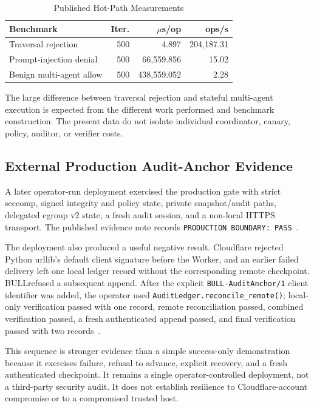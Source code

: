 \documentclass[journal]{IEEEtran}
\newcommand{\bull}{\textsc{BULL}}
\begin{document}
\begin{table}[!t]
\caption{Published Hot-Path Measurements}
\label{tab:hotpath}
\centering
\small
\begin{tabularx}{\columnwidth}{Yrrr}
\toprule
\textbf{Benchmark} & \textbf{Iter.} & \textbf{$\mu$s/op} & \textbf{ops/s} \\
\midrule
Traversal rejection & 500 & 4.897 & 204{,}187.31 \\
Prompt-injection denial & 500 & 66{,}559.856 & 15.02 \\
Benign multi-agent allow & 500 & 438{,}559.052 & 2.28 \\
\bottomrule
\end{tabularx}
\end{table}

The large difference between traversal rejection and stateful multi-agent execution is expected from the different work performed and benchmark construction. The present data do not isolate individual coordinator, canary, policy, auditor, or verifier costs.

\subsection{External Production Audit-Anchor Evidence}
A later operator-run deployment exercised the production gate with strict seccomp, signed integrity and policy state, private snapshot/audit paths, delegated cgroup v2 state, a fresh audit session, and a non-local HTTPS transport. The published evidence note records \texttt{PRODUCTION BOUNDARY: PASS}~\cite{BULL_ExternalAudit}.

The deployment also produced a useful negative result. Cloudflare rejected Python urllib's default client signature before the Worker, and an earlier failed delivery left one local ledger record without the corresponding remote checkpoint. \bull refused a subsequent append. After the explicit \texttt{BULL-AuditAnchor/1} client identifier was added, the operator used \texttt{AuditLedger.reconcile\_remote()}; local-only verification passed with one record, remote reconciliation passed, combined verification passed, a fresh authenticated append passed, and final verification passed with two records~\cite{BULL_ExternalAudit,BULL_AuditTransport}.

This sequence is stronger evidence than a simple success-only demonstration because it exercises failure, refusal to advance, explicit recovery, and a fresh authenticated checkpoint. It remains a single operator-controlled deployment, not a third-party security audit. It does not establish resilience to Cloudflare-account compromise or to a compromised trusted host.
\end{document}
